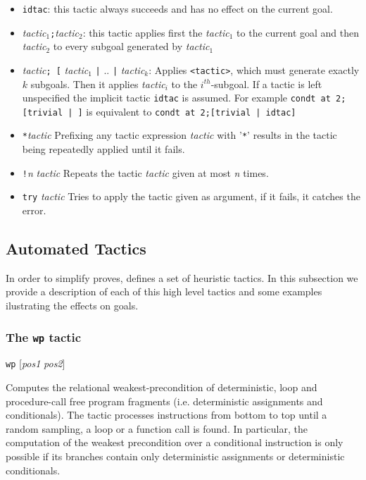 \begin{itemize}
\item\verb+idtac+: this tactic always succeeds and has no effect on the
  current goal.

\item \textit{tactic${}_1$}\verb+;+\textit{tactic${}_2$}: this tactic
  applies first the \textit{tactic${}_1$} to the current goal and then
  \textit{tactic${}_2$} to every subgoal generated by \textit{tactic${}_1$}


\item \textit{tactic}\verb+; [+ \textit{tactic${}_1$} \verb+|+
  .. \verb+|+ \textit{tactic${}_k$}: Applies
  \verb+<tactic>+, which must generate exactly $k$ subgoals. Then it
  applies \textit{tactic${}_i$} to the $i^{th}$-subgoal. 
  If a tactic is left unspecified the implicit tactic \verb+idtac+ is assumed.
  For example \verb+condt at 2;[trivial | ]+ is equivalent
  to  \verb+condt at 2;[trivial | idtac]+


\item\verb+*+\textit{tactic} Prefixing any tactic expression
  \textit{tactic} with '\verb+*+' results in the tactic being
  repeatedly applied until it fails.

\item\verb+!+\textit{n} \textit{tactic} Repeats the tactic
  \textit{tactic} given at most \textit{n} times.


\item\verb+try+ \textit{tactic} Tries to apply the tactic given as argument,
  if it fails, it catches the error.
\end{itemize}

\subsection{Automated Tactics}
In order to simplify proves, \easycrypt defines a set of heuristic
tactics. In this subsection we provide a description of each of this
high level tactics and some examples ilustrating the effects on
goals. 

\subsubsection{The \texttt{wp} tactic}\label{tac:wp} \DONE

\Syntax \verb+wp+ [\textit{pos1} \textit{pos2}]

\Description Computes the relational weakest-precondition of
deterministic, loop and procedure-call free program fragments
(i.e. deterministic assignments and conditionals).  The tactic
processes instructions from bottom to top until a random sampling, a
loop or a function call is found. In particular, the computation of
the weakest precondition over a conditional instruction is only
possible if its branches contain only deterministic assignments or
deterministic conditionals.


